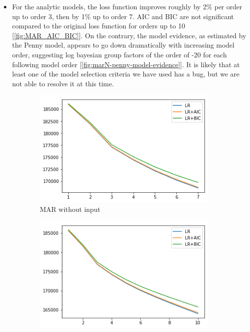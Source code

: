 \documentclass[a4paper,10pt]{article}
\begin{document}
\begin{itemize}
 \item For the analytic models, the loss function improves roughly by 2\% per order up to order 3, then by 1\% up to order 7. AIC and BIC are not significant compared to the original loss function for orders up to 10 [\cref{fig:MAR_AIC_BIC}]. On the contrary, the model evidence, as estimated by the Penny \cite{penny_bayesian_2002} model, appears to go down dramatically with increasing model order, suggesting log bayesian group factors of the order of -20 for each following model order [\cref{fig:marN-penny-model-evidence}]. It is likely that at least one of the model selection criteria we have used has a bug, but we are not able to resolve it at this time.
\end{itemize}


\begin{figure}
    \centering
    \begin{subfigure}[b]{0.4\textwidth}
        \includegraphics[width=\textwidth]{img/marN_analytic_noinput_aicbic.png}
        \caption{MAR without input}
        \label{fig:marN_analytic_noinput_aicbic}
    \end{subfigure}\hspace{0.05\textwidth}
    \begin{subfigure}[b]{0.4\textwidth}
        \includegraphics[width=\textwidth]{img/marN_analytic_withinput_aicbic.png}

\end{subfigure}
\end{figure}
\end{document}
